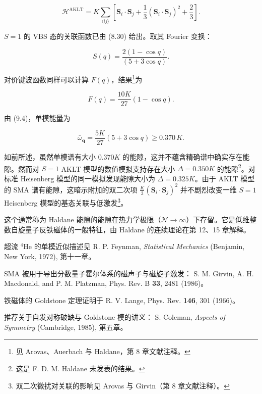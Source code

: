 \begin{equation*}
\mathcal {H} ^ {\mathrm{AKLT}} = K \sum_{\langle ij \rangle} \left[ \mathbf {S} _ {i} \cdot \mathbf {S} _ {j} + \frac {1}{3} \left( \mathbf {S} _ {i} \cdot \mathbf {S} _ {j} \right) ^ {2} + \frac {2}{3} \right].
\tag{9.18}
\end{equation*}

$S = 1$ 的 VBS 态的关联函数已由 (8.30) 给出。取其 Fourier 变换：

\begin{equation*}
S ( q ) = \frac {2 ( 1 - \cos q )}{( 5 + 3 \cos q )}.
\tag{9.19}
\end{equation*}

对价键波函数同样可以计算 $F(q)$，结果\footnote{见 Arovas、Auerbach 与 Haldane，第 8 章文献注释。}为

\begin{equation*}
F ( q ) = \frac {10 K}{27} ( 1 - \cos q ).
\tag{9.20}
\end{equation*}

由 (9.4)，单模能量为

\begin{equation*}
\bar {\omega} _ {\mathbf {q}} = \frac {5 K}{27} ( 5 + 3 \cos q ) \geq 0. 3 7 0 \, K.
\tag{9.21}
\end{equation*}

如前所述，虽然单模谱有大小 $0.370K$ 的能隙，这并不蕴含精确谱中确实存在能隙。然而对 $S = 1$ AKLT 模型的数值模拟支持存在大小 $\Delta = 0.350K$ 的能隙\footnote{这是 F. D. M. Haldane 未发表的结果。}。对标准 Heisenberg 模型的同一模拟发现能隙大小为 $\Delta = 0.325K$。由于 AKLT 模型的 SMA 谱有能隙，这暗示附加的双二次项 $\frac{K}{3}(\mathbf{S}_{i} \cdot \mathbf{S}_{j})^{2}$ 并不剧烈改变一维 $S = 1$ Heisenberg 模型的基态关联与低激发\footnote{双二次微扰对关联的影响见 Arovas 与 Girvin（第 8 章文献注释）。}。

这个通常称为 Haldane 能隙的能隙在热力学极限（$\mathcal{N} \to \infty$）下存留。它是低维整数自旋量子反铁磁体的一般特征，由 Haldane 的连续理论在第 12、15 章解释。

\begin{chapbib}
\item 超流 ${}^{4}$He 的单模近似描述见
  R. P. Feynman, \textit{Statistical Mechanics} (Benjamin, New York, 1972), 第十一章。
\item SMA 被用于导出分数量子霍尔体系的磁声子与磁旋子激发：
  S. M. Girvin, A. H. Macdonald, and P. M. Platzman, Phys. Rev. B \textbf{33}, 2481 (1986)。
\item 铁磁体的 Goldstone 定理证明于
  R. V. Lange, Phys. Rev. \textbf{146}, 301 (1966)。
\item 推荐关于自发对称破缺与 Goldstone 模的讲义：
  S. Coleman, \textit{Aspects of Symmetry} (Cambridge, 1985), 第五章。
\end{chapbib}
